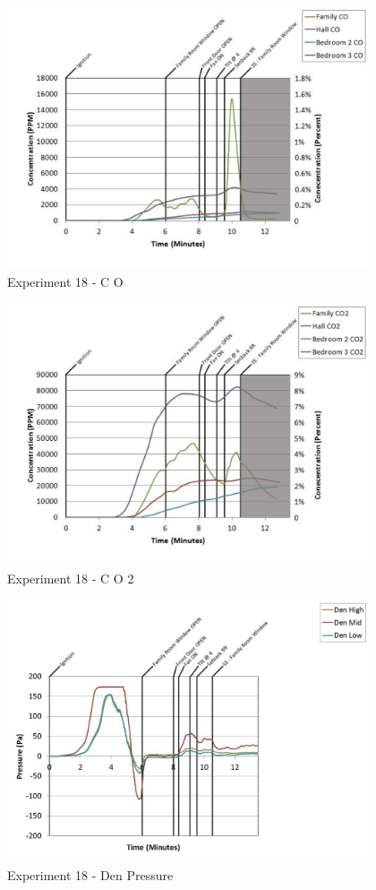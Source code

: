 \documentclass{article}
\begin{document}
\begin{appendices}
	\clearpage

	\begin{figure}[h!]
		\centering
		\includegraphics[height=3.05in]{0_Images/Results_Charts/Exp_18_Charts/CO.pdf}
		\caption{Experiment 18 - C O}
	\end{figure}
 

	\begin{figure}[h!]
		\centering
		\includegraphics[height=3.05in]{0_Images/Results_Charts/Exp_18_Charts/CO2.pdf}
		\caption{Experiment 18 - C O 2}
	\end{figure}
 
	\clearpage

	\begin{figure}[h!]
		\centering
		\includegraphics[height=3.05in]{0_Images/Results_Charts/Exp_18_Charts/DenPressure.pdf}
		\caption{Experiment 18 - Den Pressure}
	\end{figure}
 


\end{appendices}
\end{document}
